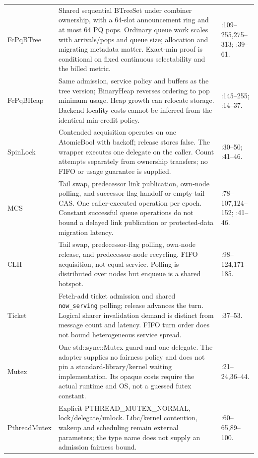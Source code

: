 \begin{longtable}{@{}P{0.14\textwidth}P{0.51\textwidth}P{0.27\textwidth}@{}}
\addlinespace
FcPqBTree & Shared sequential BTreeSet under combiner ownership, with a 64-slot announcement ring and at most 64 PQ pops. Ordinary queue work scales with arrivals/pops and queue size; allocation and migrating metadata matter. Exact-min proof is conditional on fixed continuous selectability and the billed metric. & :109--255,275--313; :39--61. \\
\addlinespace
FcPqBHeap & Same admission, service policy and buffers as the tree version; BinaryHeap reverses ordering to pop minimum usage. Heap growth can relocate storage. Backend locality costs cannot be inferred from the identical min-credit policy. & :145--255; :14--37. \\
\addlinespace
SpinLock & Contended acquisition operates on one AtomicBool with backoff; release stores false. The wrapper executes one delegate on the caller. Count attempts separately from ownership transfers; no FIFO or usage guarantee is supplied. & :30--50; :41--46. \\
\addlinespace
MCS & Tail swap, predecessor link publication, own-node polling, and successor flag handoff or empty-tail CAS. One caller-executed operation per epoch. Constant successful queue operations do not bound a delayed link publication or protected-data migration latency. & :78--107,124--152; :41--46. \\
\addlinespace
CLH & Tail swap, predecessor-flag polling, own-node release, and predecessor-node recycling. FIFO acquisition, not equal service. Polling is distributed over nodes but enqueue is a shared hotspot. & :98--124,171--185. \\
\addlinespace
Ticket & Fetch-add ticket admission and shared \texttt{now\_serving} polling; release advances the turn. Logical sharer invalidation demand is distinct from message count and latency. FIFO turn order does not bound heterogeneous service spread. & :37--53. \\
\addlinespace
Mutex & One std::sync::Mutex guard and one delegate. The adapter supplies no fairness policy and does not pin a standard-library/kernel waiting implementation. Its opaque costs require the actual runtime and OS, not a guessed futex constant. & :21--24,36--44. \\
\addlinespace
PthreadMutex & Explicit PTHREAD\_MUTEX\_NORMAL, lock/delegate/unlock. Libc/kernel contention, wakeup and scheduling remain external parameters; the type name does not supply an admission fairness bound. & :60--65,89--100. \\

\end{longtable}
